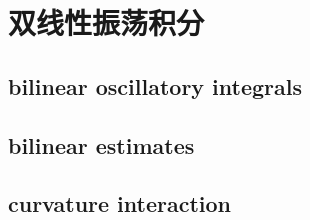 \section{双线性振荡积分}
\label{b2:sec:2503}


\subsection{bilinear oscillatory integrals}
\label{b2:subsec:250301}

\subsection{bilinear estimates}
\label{b2:subsec:250302}

\subsection{curvature interaction}
\label{b2:subsec:250303}


